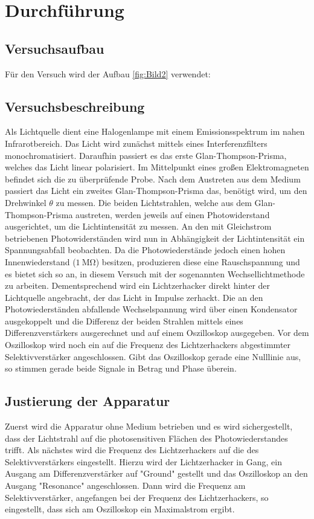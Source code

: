 \section{Durchführung}
\label{sec:Durchführung}
\subsection{Versuchsaufbau}
Für den Versuch wird der Aufbau \ref{fig:Bild2} verwendet:
\subsection{Versuchsbeschreibung}
\label{sec:Versuchsbeschreibung}
Als Lichtquelle dient eine Halogenlampe mit einem Emissionsspektrum im nahen Infrarotbereich. 
Das Licht wird zunächst mittels eines Interferenzfilters monochromatisiert. 
Daraufhin passiert es das erste Glan-Thompson-Prisma, welches das Licht linear polarisiert.
Im Mittelpunkt eines großen Elektromagneten befindet sich die zu überprüfende Probe.
Nach dem Austreten aus dem Medium passiert das Licht ein zweites Glan-Thompson-Prisma das,
benötigt wird, um den Drehwinkel $\theta$ zu messen. Die beiden Lichtstrahlen, welche aus dem
Glan-Thompson-Prisma austreten, werden jeweils auf einen Photowiderstand ausgerichtet, um die
Lichtintensität zu messen. An den mit Gleichstrom betriebenen Photowiderständen wird nun in
Abhängigkeit der Lichtintensität ein Spannungsabfall beobachten. Da die Photowiederstände jedoch
einen hohen Innenwiederstand ($\SI{1}{\mega\ohm}$) besitzen, produzieren diese eine
Rauschspannung und es bietet sich so an, in diesem Versuch mit der sogenannten
Wechsellichtmethode zu arbeiten. Dementsprechend wird ein Lichtzerhacker direkt hinter der
Lichtquelle angebracht, der das Licht in Impulse zerhackt. Die an den Photowiederständen
abfallende Wechselspannung wird über einen Kondensator ausgekoppelt und die Differenz der 
beiden Strahlen mittels eines Differenzverstärkers ausgerechnet und auf einem Oszilloskop
ausgegeben. Vor dem Oszilloskop wird noch ein auf die Frequenz des Lichtzerhackers abgestimmter
Selektivverstärker angeschlossen. Gibt das Oszilloskop gerade eine Nulllinie aus, so stimmen
gerade beide Signale in Betrag und Phase überein. 
\subsection{Justierung der Apparatur}
Zuerst wird die Apparatur ohne Medium betrieben und es wird sichergestellt, dass der Lichtstrahl
auf die photosensitiven Flächen des Photowiederstandes trifft. Als nächstes wird die Frequenz 
des Lichtzerhackers auf die des Selektivverstärkers eingestellt. Hierzu wird der Lichtzerhacker
in Gang, ein Ausgang am Differenzverstärker auf "Ground" gestellt und das Oszilloskop an den
Ausgang "Resonance" angeschlossen. Dann wird die Frequenz am Selektivverstärker, angefangen
bei der Frequenz des Lichtzerhackers, so eingestellt, dass sich am Oszilloskop ein Maximalstrom 
ergibt.
